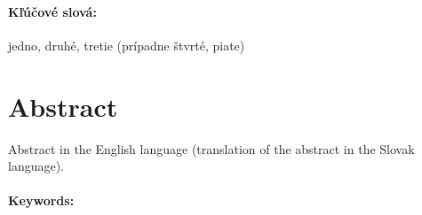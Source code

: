 \documentclass[12pt, oneside]{book}
\begin{document}
\paragraph*{Kľúčové slová:} jedno, druhé, tretie (prípadne štvrté, piate)


\newpage 
\section*{Abstract}

Abstract in the English language (translation of the abstract in the
Slovak language).


\paragraph*{Keywords:} 


%
%



\newpage 

\tableofcontents






\mainmatter


 









%
\end{document}
